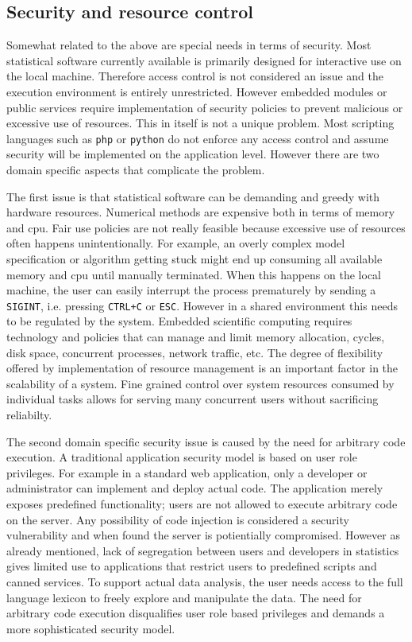 \documentclass{article}
\begin{document}
\subsection{Security and resource control}

Somewhat related to the above are special needs in terms of security. Most statistical software currently available is primarily designed for interactive use on the local machine. Therefore access control is not considered an issue and the execution environment is entirely unrestricted. However embedded modules or public services require implementation of security policies to prevent malicious or excessive use of resources. This in itself is not a unique problem. Most scripting languages such as \texttt{php} or \texttt{python} do not enforce any access control and assume security will be implemented on the application level. However there are two domain specific aspects that complicate the problem. 

The first issue is that statistical software can be demanding and greedy with hardware resources. Numerical methods are expensive both in terms of memory and cpu. Fair use policies are not really feasible because excessive use of resources often happens unintentionally. For example, an overly complex model specification or algorithm getting stuck might end up consuming all available memory and cpu until manually terminated. When this happens on the local machine, the user can easily interrupt the process prematurely by sending a \texttt{SIGINT}, i.e. pressing \texttt{CTRL+C} or \texttt{ESC}. However in a shared environment this needs to be regulated by the system. Embedded scientific computing requires technology and policies that can manage and limit memory allocation, cycles, disk space, concurrent processes, network traffic, etc. The degree of flexibility offered by implementation of resource management is an important factor in the scalability of a system. Fine grained control over system resources consumed by individual tasks allows for serving many concurrent users without sacrificing reliabilty. 

The second domain specific security issue is caused by the need for arbitrary code execution. A traditional application security model is based on user role privileges. For example in a standard web application, only a developer or administrator can implement and deploy actual code. The application merely exposes predefined functionality; users are not allowed to execute arbitrary code on the server. Any possibility of code injection is considered a security vulnerability and when found the server is potientially compromised. However as already mentioned, lack of segregation between users and developers in statistics gives limited use to applications that restrict users to predefined scripts and canned services. To support actual data analysis, the user needs access to the full language lexicon to freely explore and manipulate the data. The need for arbitrary code execution disqualifies user role based privileges and demands a more sophisticated security model. 
\end{document}
